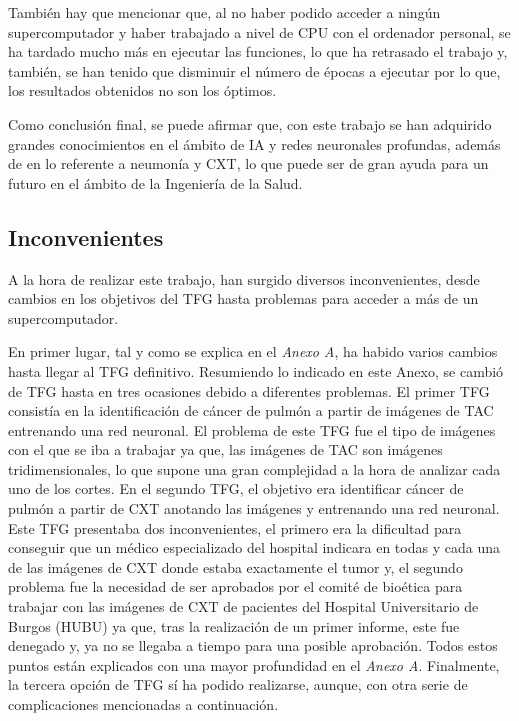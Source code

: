 También hay que mencionar que, al no haber podido acceder a ningún supercomputador y haber trabajado a nivel de CPU con el ordenador personal, se ha tardado mucho más en ejecutar las funciones, lo que ha retrasado el trabajo y, también, se han tenido que disminuir el número de épocas a ejecutar por lo que, los resultados obtenidos no son los óptimos.

Como conclusión final, se puede afirmar que, con este trabajo se han adquirido grandes conocimientos en el ámbito de IA y redes neuronales profundas, además de en lo referente a neumonía y CXT, lo que puede ser de gran ayuda para un futuro en el ámbito de la Ingeniería de la Salud.

\subsection{Inconvenientes}

A la hora de realizar este trabajo, han surgido diversos inconvenientes, desde cambios en los objetivos del TFG hasta problemas para acceder a más de un supercomputador.

En primer lugar, tal y como se explica en el \textit{Anexo A}, ha habido varios cambios hasta llegar al TFG definitivo. Resumiendo lo indicado en este Anexo, se cambió de TFG hasta en tres ocasiones debido a diferentes problemas. El primer TFG consistía en la identificación de cáncer de pulmón a partir de imágenes de TAC entrenando una red neuronal. El problema de este TFG fue el tipo de imágenes con el que se iba a trabajar ya que, las imágenes de TAC son imágenes tridimensionales, lo que supone una gran complejidad a la hora de analizar cada uno de los cortes. En el segundo TFG, el objetivo era identificar cáncer de pulmón a partir de CXT anotando las imágenes y entrenando una red neuronal. Este TFG presentaba dos inconvenientes, el primero era la dificultad para conseguir que un médico especializado del hospital indicara en todas y cada una de las imágenes de CXT donde estaba exactamente el tumor y, el segundo problema fue la necesidad de ser aprobados por el comité de bioética para trabajar con las imágenes de CXT de pacientes del Hospital Universitario de Burgos (HUBU) ya que, tras la realización de un primer informe, este fue denegado y, ya no se llegaba a tiempo para una posible aprobación. Todos estos puntos están explicados con una mayor profundidad en el \textit{Anexo A}. Finalmente, la tercera opción de TFG sí ha podido realizarse, aunque, con otra serie de complicaciones mencionadas a continuación.


